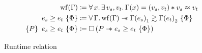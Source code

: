 \begin{figure}[tp]
    \begin{align*}
        	\wf{\datalangBisubst}
    		& \coloneqq
    		\forall \datalangVar \ldotp
    		\exists \datalangVal_s, \datalangVal_t \ldotp
    		\datalangBisubst (\datalangVar) = (\datalangVal_s, \datalangVal_t) \iSep
    		\datalangVal_s \iSimilar \datalangVal_t
        \\
    		\iRsimv{\iPred}{\datalangExpr_s}{\datalangExpr_t}
    		& \coloneqq
    		\forall \datalangBisubst \ldotp
    		\wf{\datalangBisubst} \iWand
    		\iSimv{\iPred}{{\datalangBisubst (\datalangExpr_s)}_1}{{\datalangBisubst (\datalangExpr_t)}_2}
    	\\
    	   \iRsimvHoare{P}{\iPred}{\datalangExpr_s}{\datalangExpr_t}
    	   & \coloneqq
    	   \iPersistent \left( P \iWand \iRsimv{\iPred}{\datalangExpr_s}{\datalangExpr_t} \right)
    \end{align*}
    \caption{Runtime relation}
    \label{fig:rsim}
\end{figure}